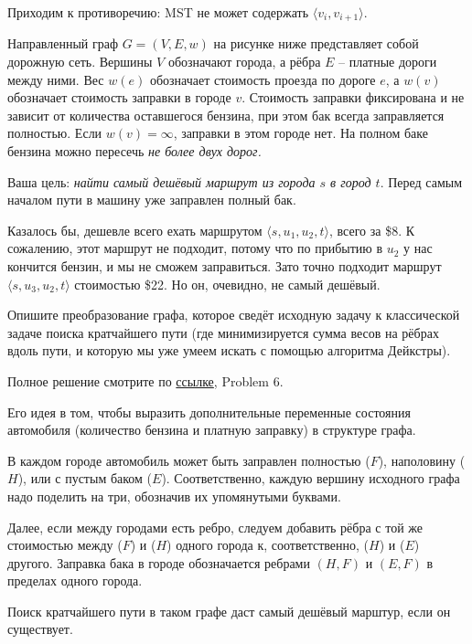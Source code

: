 \documentclass[12pt,answers]{exam}
\begin{document}
\begin{questions}
\begin{solution}
    Приходим к противоречию: MST не может содержать $\langle v_i, v_{i+1} \rangle$.
  \end{solution}

\question[7]
Направленный граф $G=(V,E,w)$ на рисунке ниже представляет собой дорожную сеть. Вершины $V$ обозначают города, а рёбра $E$ -- платные дороги между ними. Вес $w(e)$ обозначает стоимость проезда по дороге $e$, а $w(v)$ обозначает стоимость заправки в городе $v$. Стоимость заправки фиксирована и не зависит от количества оставшегося бензина, при этом бак всегда заправляется полностью. Если $w(v)=\infty$, заправки в этом городе нет. На полном баке бензина можно пересечь {\em не более двух дорог.}

Ваша цель: {\em найти самый дешёвый маршрут из города $s$ в город $t$}. Перед самым началом пути в машину уже заправлен полный бак.

Казалось бы, дешевле всего ехать маршрутом
$\langle s, u_1, u_2, t \rangle$, всего за \$8.
К сожалению, этот маршрут не подходит, потому что по прибытию в $u_2$ у нас кончится бензин, и мы не сможем заправиться.
Зато точно подходит маршрут
$\langle s, u_3, u_2, t \rangle$ стоимостью \$22. Но он, очевидно, не самый дешёвый.

Опишите преобразование графа, которое сведёт исходную задачу к классической задаче поиска кратчайшего пути (где минимизируется сумма весов на рёбрах вдоль пути, и которую мы уже умеем искать с помощью алгоритма Дейкстры).

\begin{solution}
Полное решение смотрите по \href{https://ocw.mit.edu/courses/electrical-engineering-and-computer-science/6-006-introduction-to-algorithms-fall-2011/exams/MIT6_006F11_quiz2_sol.pdf}{ссылке}, Problem 6.

Его идея в том, чтобы выразить дополнительные переменные состояния автомобиля (количество бензина и платную заправку) в структуре графа.

В каждом городе автомобиль может быть заправлен полностью ($F$), наполовину ($H$), или с пустым баком ($E$). Соответственно, каждую вершину исходного графа надо поделить на три, обозначив их упомянутыми буквами.

Далее, если между городами есть ребро, следуем добавить рёбра с той же стоимостью между ($F$) и ($H$) одного города к, соответственно, ($H$) и ($E$) другого. Заправка бака в городе обозначается ребрами $(H, F)$ и $(E, F)$ в пределах одного города.

Поиск кратчайшего пути в таком графе даст самый дешёвый марштур, если он существует.
\end{solution}


\end{questions}
\end{document}
